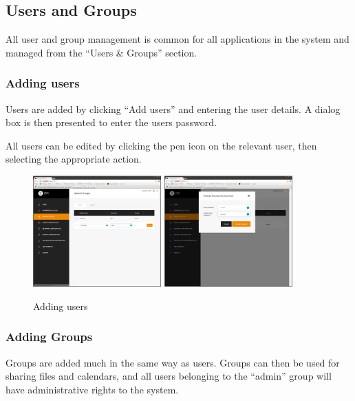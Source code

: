 \documentclass[12pt,a4paper,titlepage]{article}
\begin{document}
\subsection{Users and Groups}
All user and group management is common for all applications in the system and managed from the ``Users \& Groups'' section.
\subsubsection{Adding users}
Users are added by clicking ``Add users'' and entering the user details. A dialog box is then presented to enter the users password.

All users can be edited by clicking the pen icon on the relevant user, then selecting the appropriate action.
\begin{figure}[h]
\centering
\includegraphics[width=4.93cm]{./img/users-1}
\includegraphics[width=4.93cm]{./img/users-2}
\caption{Adding users}
\end{figure}

\subsubsection{Adding Groups}
Groups are added much in the same way as users. Groups can then be used for sharing files and calendars, and all users belonging to the ``admin'' group will have administrative rights to the system.
\end{document}
